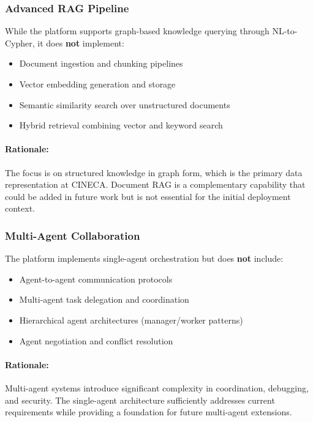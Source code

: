 \subsubsection{Advanced RAG Pipeline}

While the platform supports graph-based knowledge querying through NL-to-Cypher, it does \textbf{not} implement:

\begin{itemize}
    \item Document ingestion and chunking pipelines
    \item Vector embedding generation and storage
    \item Semantic similarity search over unstructured documents
    \item Hybrid retrieval combining vector and keyword search
\end{itemize}

\paragraph{Rationale:} The focus is on structured knowledge in graph form, which is the primary data representation at CINECA. Document RAG is a complementary capability that could be added in future work but is not essential for the initial deployment context.

\subsubsection{Multi-Agent Collaboration}

The platform implements single-agent orchestration but does \textbf{not} include:

\begin{itemize}
    \item Agent-to-agent communication protocols
    \item Multi-agent task delegation and coordination
    \item Hierarchical agent architectures (manager/worker patterns)
    \item Agent negotiation and conflict resolution
\end{itemize}

\paragraph{Rationale:} Multi-agent systems introduce significant complexity in coordination, debugging, and security. The single-agent architecture sufficiently addresses current requirements while providing a foundation for future multi-agent extensions.

